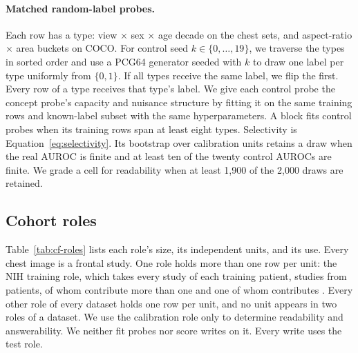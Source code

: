 \documentclass{article}
\begin{document}
\paragraph{Matched random-label probes.} Each row has a type: view $\times$ sex $\times$ age decade on the chest sets, and aspect-ratio $\times$ area buckets on COCO. For control seed $k\in\{0,\dots,19\}$, we traverse the types in sorted order and use a PCG64 generator seeded with $k$ to draw one label per type uniformly from $\{0,1\}$. If all types receive the same label, we flip the first. Every row of a type receives that type's label. We give each control probe the concept probe's capacity and nuisance structure by fitting it on the same training rows and known-label subset with the same hyperparameters. A block fits control probes when its training rows span at least eight types. Selectivity is Equation~\ref{eq:selectivity}. Its bootstrap over calibration units retains a draw when the real AUROC is finite and at least ten of the twenty control AUROCs are finite. We grade a cell for readability when at least 1{,}900 of the 2{,}000 draws are retained.

\subsection{Cohort roles}
\label{app:repro-cohorts}

Table~\ref{tab:cf-roles} lists each role's size, its independent units, and its use. Every chest image is a frontal study. One role holds more than one row per unit: the NIH training role, which takes every study of each training patient, \cfCohortNihTrainRows{} studies from \cfCohortNihTrainUnits{} patients, \cfCohortNihTrainMulti{} of whom contribute more than one and one of whom contributes \cfCohortNihTrainMax{}. Every other role of every dataset holds one row per unit, and no unit appears in two roles of a dataset. We use the calibration role only to determine readability and answerability. We neither fit probes nor score writes on it. Every write uses the test role.
\end{document}
